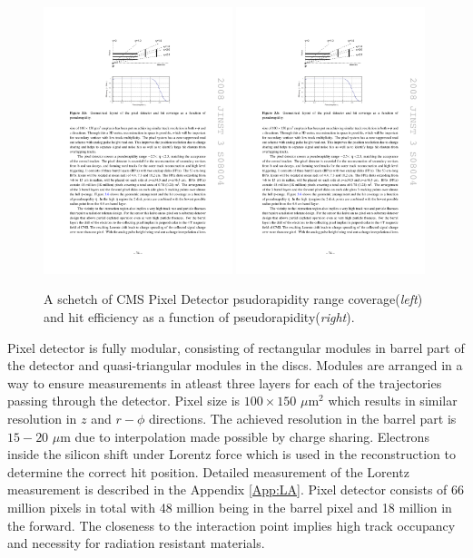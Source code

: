 \begin{figure}[htbp]
	\centering
		\includegraphics[width=0.49\textwidth]{Figures/pixel_eta.pdf}
		\includegraphics[width=0.49\textwidth]{Figures/pixel_eta2.pdf}
	\caption[CMS Pixel Detector psudorapidity range coverage and efficiency]{A schetch of CMS Pixel Detector psudorapidity range coverage(\textit{left}) and hit efficiency as a function of pseudorapidity(\textit{right}). \cite{Chatrchyan:2008aa}}
	\label{fig:pixels_eta}
\end{figure}
\par Pixel detector is fully modular, consisting of rectangular modules in barrel part of the detector and quasi-triangular modules in the discs. Modules are arranged in a way to ensure measurements in atleast three layers for each of the trajectories passing through the detector. Pixel size is $100\times150$ $\mu$m$^2$ which results in similar resolution in $z$ and $r-\phi$ directions. The achieved resolution in the barrel part is $15-20$ $\mu$m due to interpolation made possible by charge sharing. Electrons inside the silicon shift under Lorentz force which is used in the reconstruction to determine the correct hit position. Detailed measurement of the Lorentz measurement is described in the Appendix \ref{App:LA}. Pixel detector consists of 66 million pixels in total with 48 million being in the barrel pixel and 18 million in the forward. The closeness to the interaction point implies high track occupancy and necessity for radiation resistant materials. 
